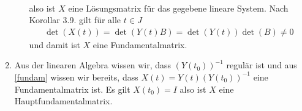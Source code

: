 \begin{solution}
\begin{enumerate}[label = \alph*)]
\begin{enumerate}
\begin{align*}
            \end{align*}  
            also ist $X$ eine Lösungsmatrix für das gegebene lineare System. Nach Korollar 3.9. gilt für alle $t \in J$
            \begin{align*}
                \det(X(t)) = \det(Y(t)B) = \det(Y(t)) \det(B) \neq 0
            \end{align*}
            und damit ist $X$ eine Fundamentalmatrix.
        \end{enumerate}
        \item Aus der linearen Algebra wissen wir, dass $(Y(t_0))^{-1}$ regulär ist und aus \ref{fundam} wissen wir bereits, dass $X(t) = Y(t) (Y(t_0))^{-1}$ eine Fundamentalmatrix ist. Es gilt $X(t_0) = I$ also ist $X$ eine Hauptfundamentalmatrix.
    \end{enumerate}
\end{solution}
